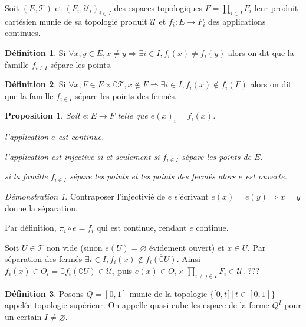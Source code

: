 \documentclass[a4paper, 11pt, french]{book}
\newenvironment{itemise}{\itemize}{\enditemize}
\theoremstyle{plain} %
\newtheorem{proposition}{Proposition}
\theoremstyle{definition} %
\newtheorem{definition}{Définition}
\theoremstyle{remark} %
\newtheorem*{demonstration}{Démonstration}
\newcommand{\1}{\mathds{1}}
\newcommand\vide{\varnothing}
\newcommand\ens[2]{\{#1 \ |\ #2\}}
\begin{document}
Soit $(E, \mathscr{T})$ et $(F_i, \mathscr{U}_i)_{i\in I}$ des espaces topologiques $F=\prod_{i\in I}F_i$ leur produit cartésien munie de sa topologie produit $\mathscr{U}$ et $f_i:E\rightarrow F_i$ des applications continues.

\begin{definition}
	Si $\forall x, y\in E, x\neq y\Rightarrow\exists i\in I, f_i(x)\neq f_i(y)$ alors on dit que la famille $f_{i\in I}$ sépare les points.
\end{definition}

\begin{definition}
	Si $\forall x, F\in E\times\complement\mathscr{T}, x\notin F\Rightarrow\exists i\in I, f_i(x)\notin\overline{f_i(F)}$ alors on dit que la famille $f_{i\in I}$ sépare les points des fermés.
\end{definition}

\begin{proposition}
	Soit $e:E\rightarrow F$ telle que $e(x)_i=f_i(x)$.
	\begin{itemise}
		\item l'application $e$ est continue.
		\item l'application est injective si et seulement si $f_{i\in I}$ sépare les points de $E$.
		\item si la famille $f_{i\in I}$ sépare les points et les points des fermés alors $e$ est ouverte.
	\end{itemise}
\end{proposition}

\begin{demonstration}
	\begin{itemise}
		\item Contraposer l'injectivié de $e$ s'écrivant $e(x)=e(y)\Rightarrow x=y$ donne la séparation.
		\item Par définition, $\pi_i\circ e=f_i$  qui est continue, rendant $e$ continue.
		\item Soit $U\in\mathscr{T}$ non vide (sinon $e(U)=\vide$ évidement ouvert) et $x\in U$.
		Par séparation des fermés $\exists i\in I, f_i(x)\notin\overline{f_i(\complement U)}$.
		Ainsi $f_i(x)\in O_i=\complement\overline{f_i(\complement U)}\in\mathscr{U}_i$ puis $e(x)\in O_i\times\prod_{i\neq j\in I}F_i\in\mathscr{U}$.
		{\color{red} ???}
	\end{itemise}
\end{demonstration}

\begin{definition}
	Posons $Q=[0, 1]$ munie de la topologie $\ens{[0, t[}{t\in[0, 1]}$ appelée topologie supérieur.
	On appelle quasi-cube les espace de la forme $Q^I$ pour un certain $I\neq\vide$.
\end{definition}
\end{document}
